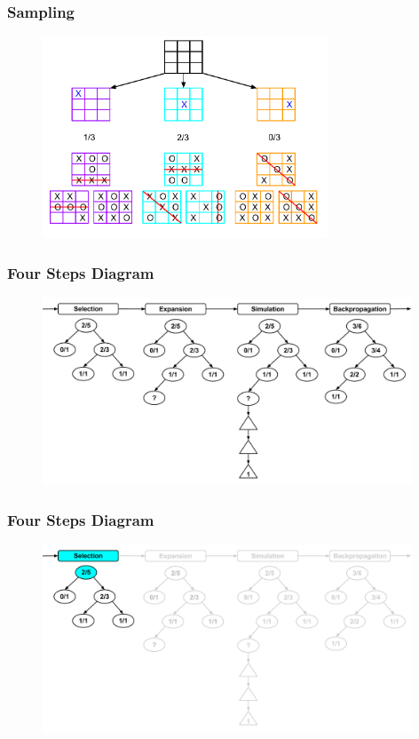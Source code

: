 \documentclass{beamer}
\begin{document}
\begin{frame}[fragile]
\frametitle{Sampling}
\begin{figure}[h]
	\includegraphics[width=8.5cm]{Diagrams/TicTacToe/TicTacToeTreeSampling.pdf}
	\centering
\end{figure}
\end{frame}


\begin{frame}[fragile]
\frametitle{Four Steps Diagram}
\begin{figure}[h]
	\includegraphics[width=11cm]{Diagrams/FourSteps/MCTSFourStepProcessWhole.pdf}
	\centering
\end{figure}
\end{frame}

\begin{frame}[fragile]
\frametitle{Four Steps Diagram}
\begin{figure}[h]
	\includegraphics[width=11cm]{Diagrams/FourSteps/MCTSFourStepProcessOneOne.pdf}
	\centering
\end{figure}
\end{frame}
\end{document}

